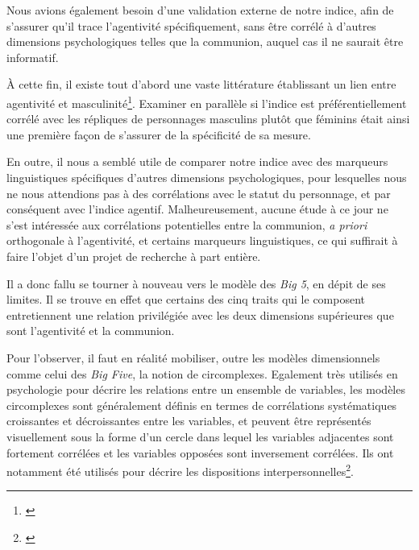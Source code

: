 Nous avions également besoin d’une validation externe de notre indice, afin de s’assurer qu’il trace l’agentivité spécifiquement, sans être corrélé à d'autres dimensions psychologiques telles que la communion, auquel cas il ne saurait être informatif.

À cette fin, il existe tout d’abord une vaste littérature établissant un lien entre agentivité et masculinité\footnote{\cite{neria_encyclopedia_2016}}. Examiner en parallèle si l'indice est préférentiellement corrélé avec les répliques de personnages masculins plutôt que féminins était ainsi une première façon de s'assurer de la spécificité de sa mesure.

En outre, il nous a semblé utile de comparer notre indice avec des marqueurs linguistiques spécifiques d’autres dimensions psychologiques, pour lesquelles nous ne nous attendions pas à des corrélations avec le statut du personnage, et par conséquent avec l'indice agentif. Malheureusement, aucune étude à ce jour ne s'est intéressée aux corrélations potentielles entre la communion, \textit{a priori} orthogonale à l’agentivité, et certains marqueurs linguistiques, ce qui suffirait à faire l'objet d'un projet de recherche à part entière. 

Il a donc fallu se tourner à nouveau vers le modèle des \textit{Big 5}, en dépit de ses limites. Il se trouve en effet que certains des cinq traits qui le composent entretiennent une relation privilégiée avec les deux dimensions supérieures que sont l’agentivité et la communion. 

Pour l'observer, il faut en réalité mobiliser, outre les modèles dimensionnels comme celui des \textit{Big Five}, la notion de circomplexes. Egalement très utilisés en psychologie pour décrire les relations entre un ensemble de variables, les modèles circomplexes sont généralement définis en termes de corrélations systématiques croissantes et décroissantes entre les variables, et peuvent être représentés visuellement sous la forme d'un cercle dans lequel les variables adjacentes sont fortement corrélées et les variables opposées sont inversement corrélées. Ils ont notamment été utilisés pour décrire les dispositions interpersonnelles\footnote{\cite{wiggins 1979}}. 

